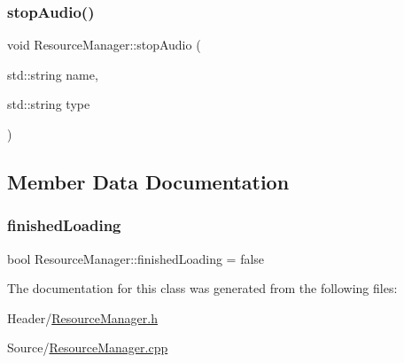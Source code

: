 \mbox{\label{class_resource_manager_ae9e9bbbf00d4644f60d88da0b122e279}} 
\subsubsection{\texorpdfstring{stopAudio()}{stopAudio()}}
{\footnotesize\ttfamily void Resource\+Manager\+::stop\+Audio (\begin{DoxyParamCaption}\item[{std\+::string}]{name,  }\item[{std\+::string}]{type }\end{DoxyParamCaption})}



\subsection{Member Data Documentation}
\mbox{\label{class_resource_manager_a6e46ce9f52aa0a19bfd9ee21aa259e8d}} 
\subsubsection{\texorpdfstring{finishedLoading}{finishedLoading}}
{\footnotesize\ttfamily bool Resource\+Manager\+::finished\+Loading = false}



The documentation for this class was generated from the following files\+:\begin{DoxyCompactItemize}
\item 
Header/\mbox{\hyperlink{_resource_manager_8h}{Resource\+Manager.\+h}}\item 
Source/\mbox{\hyperlink{_resource_manager_8cpp}{Resource\+Manager.\+cpp}}\end{DoxyCompactItemize}
